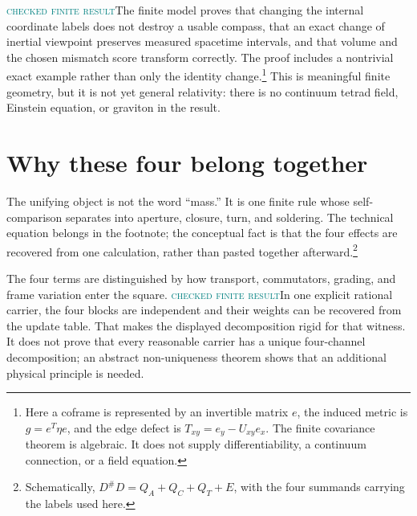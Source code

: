 \documentclass[11pt]{article}
\newcommand{\Mlabel}{\textcolor{teal}{\textsc{checked finite result}}}
\begin{document}
\Mlabel\quad The finite model proves that changing the internal coordinate
labels does not destroy a usable compass, that an exact change of inertial
viewpoint preserves measured spacetime intervals, and that volume and the
chosen mismatch score transform correctly.  The proof includes a nontrivial
exact example rather than only the identity change.\footnote{Here a coframe is represented by an
invertible matrix $e$, the induced metric is $g=e^T\eta e$, and the edge defect
is $T_{xy}=e_y-U_{xy}e_x$.  The finite covariance theorem is algebraic.  It does
not supply differentiability, a continuum connection, or a field equation.}
This is meaningful finite geometry, but it is not
yet general relativity: there is no continuum tetrad field, Einstein equation,
or graviton in the result.

\section{Why these four belong together}

The unifying object is not the word ``mass.''  It is one finite rule whose
self-comparison separates into aperture, closure, turn, and soldering.  The
technical equation belongs in the footnote; the conceptual fact is that the
four effects are recovered from one calculation, rather than pasted together
afterward.\footnote{Schematically,
$D^\#D=Q_A+Q_C+Q_T+E$, with the four summands carrying the labels used here.}

The four terms are distinguished by how transport, commutators, grading, and
frame variation enter the square.  \Mlabel\quad In one explicit rational
carrier, the four
blocks are independent and their weights can be recovered from
the update table.  That makes the displayed decomposition rigid for that
witness.  It does not prove that every reasonable carrier has a unique
four-channel decomposition; an abstract non-uniqueness theorem shows that an
additional physical principle is needed.

\begin{center}
\end{center}
\end{document}
